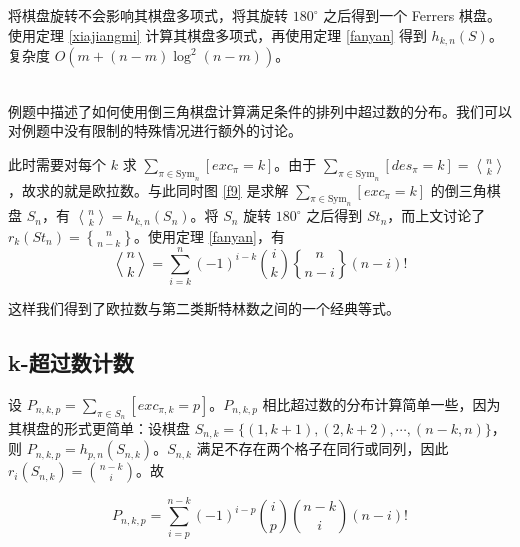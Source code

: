\documentclass{noithesis}
\begin{document}
	将棋盘旋转不会影响其棋盘多项式，将其旋转 $180^\circ$ 之后得到一个 Ferrers 棋盘。使用定理 \ref{xiajiangmi} 计算其棋盘多项式，再使用定理 \ref{fanyan} 得到 $h_{k,n}(S)$。复杂度 $O(m+(n-m) \log^2 (n-m))$。
	
	~\\
	
	例题中描述了如何使用倒三角棋盘计算满足条件的排列中超过数的分布。我们可以对例题中没有限制的特殊情况进行额外的讨论。
	
	此时需要对每个 $k$ 求 $\sum_{\pi \in \mathrm{Sym}_n} [exc_{\pi} = k]$。由于 $\sum_{\pi \in \mathrm{Sym}_n} [des_{\pi} = k] = {n \bangle k}$，故求的就是欧拉数。与此同时图 \ref{f9} 是求解 $\sum_{\pi \in \mathrm{Sym}_n} [exc_{\pi} = k]$ 的倒三角棋盘 $S_n$，有 ${n \bangle k} = h_{k,n}(S_n)$。将 $S_n$ 旋转 $180^\circ$ 之后得到 $St_n$，而上文讨论了 $r_k(St_n) = {n \brace n-k}$。使用定理 \ref{fanyan}，有 $${n \bangle k} = \sum_{i=k}^n (-1)^{i-k} \binom{i}{k} {n \brace n-i} (n-i)!$$
	
	这样我们得到了欧拉数与第二类斯特林数之间的一个经典等式。
	
	\subsection{k-超过数计数}
	
	设 $P_{n,k,p} = \sum_{\pi \in S_n} [exc_{\pi , k} = p]$。$P_{n,k,p}$ 相比超过数的分布计算简单一些，因为其棋盘的形式更简单：设棋盘 $S_{n,k} = \{(1,k+1),(2,k+2),\cdots,(n-k,n)\}$，则 $P_{n,k,p} = h_{p,n}(S_{n,k})$。$S_{n,k}$ 满足不存在两个格子在同行或同列，因此 $r_i(S_{n,k}) = \binom{n-k}{i}$。故
	\begin{theorem}
		\begin{equation}\label{calckexc}
		P_{n,k,p} = \sum_{i=p}^{n-k} (-1)^{i-p} \binom{i}{p} \binom{n-k}{i} (n-i)!
		\end{equation}
	\end{theorem}
	
\end{document}
